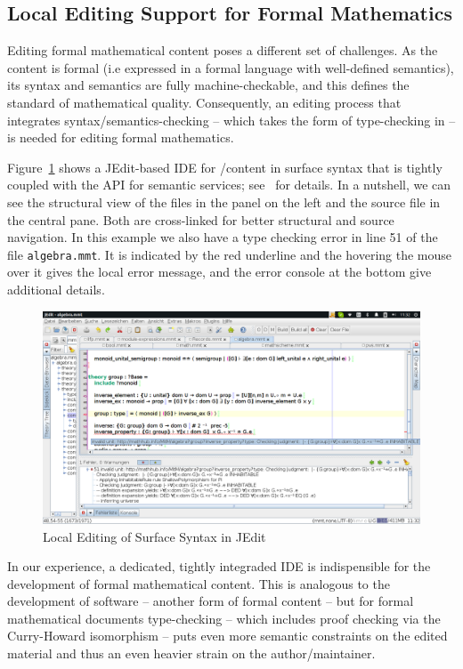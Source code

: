 \subsection{Local Editing Support for Formal Mathematics}\label{sec:local-formal}

Editing formal mathematical content poses a different set of challenges. As the content is
formal (i.e expressed in a formal language with well-defined semantics), its syntax and
semantics are fully machine-checkable, and this defines the standard of mathematical
quality. Consequently, an editing process that integrates syntax/semantics-checking --
which takes the form of type-checking in \mmt -- is needed for editing formal mathematics.

Figure~\ref{fig:jedit2} shows a JEdit-based IDE for \omdoc/\mmt content in \mmt surface
syntax that is tightly coupled with the \mmt API for semantic services;
see~\cite{Rabe:LII14} for details. In a nutshell, we can see the structural view of the
files in the panel on the left and the source file in the central pane. Both are
cross-linked for better structural and source navigation. In this example we also have a
type checking error in line 51 of the file \texttt{algebra.mmt}. It is indicated by the
red underline and the hovering the mouse over it gives the local error message, and the
error console at the bottom give additional details.

\begin{figure}[ht]\centering
  \includegraphics[width=15cm]{jedit2}
  \caption{Local Editing of \mmt Surface Syntax in JEdit}\label{fig:jedit2}
\end{figure}

In our experience, a dedicated, tightly integraded IDE is indispensible for the
development of formal mathematical content. This is analogous to the development of
software -- another form of formal content -- but for formal mathematical documents
type-checking -- which includes proof checking via the Curry-Howard isomorphism -- puts
even more semantic constraints on the edited material and thus an even heavier strain on
the author/maintainer.

